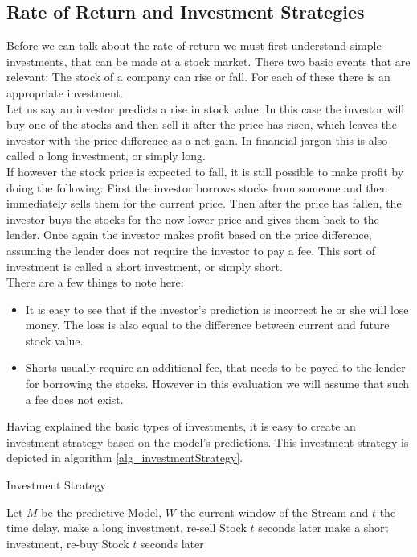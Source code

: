 \subsection{Rate of Return and Investment Strategies}
\label{subsec_investmentStrageties}
Before we can talk about the rate of return we must first understand simple investments, that can be made at a stock market. There two basic events that are relevant: The stock of a company can rise or fall. For each of these there is an appropriate investment. \\
Let us say an investor predicts a rise in stock value. In this case the investor will buy one of the stocks and then sell it after the price has risen, which leaves the investor with the price difference as a net-gain. In financial jargon this is also called a long investment, or simply long. \\
If however the stock price is expected to fall, it is still possible to make profit by doing the following: First the investor borrows stocks from someone and then immediately sells them for the current price. Then after the price has fallen, the investor buys the stocks for the now lower price and gives them back to the lender. Once again the investor makes profit based on the price difference, assuming the lender does not require the investor to pay a fee. This sort of investment is called a short investment, or simply short. \\
There are a few things to note here:
\begin{itemize}
	\item It is easy to see that if the investor's prediction is incorrect he or she will lose money. The loss is also equal to the difference between current and future stock value.
	\item Shorts usually require an additional fee, that needs to be payed to the lender for borrowing the stocks. However in this evaluation we will assume that such a fee does not exist.
\end{itemize}

Having explained the basic types of investments, it is easy to create an investment strategy based on the model's predictions. This investment strategy is depicted in algorithm \ref{alg_investmentStrategy}. 

\begin{algorithm}[H]
  \caption{Investment Strategy
    \label{alg_investmentStrategy}}
  \begin{algorithmic}[1]
    \Statex
    \Require Let $M$ be the predictive Model, $W$ the current window of the Stream and $t$ the time delay.
      		\State make a long investment, re-sell Stock $t$ seconds later
			\State make a short investment, re-buy Stock $t$ seconds later
       	\EndIf
    \EndFunction
  \end{algorithmic}
\end{algorithm}

